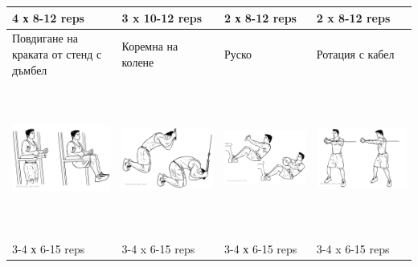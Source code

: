 \documentclass{article}
\begin{document}
\begin{tabular}{ | m{4cm} | m{4cm} | m{4cm} |  m{4cm} | }
4 х 8-12 reps & 3 x 10-12 reps & 2 х 8-12 reps & 2 x 8-12 reps \\ 
\hline
Повдигане на краката от стенд с дъмбел&  Коремна на колене & Руско & Ротация с кабел \\ 
\begin{minipage}{4cm} \includegraphics[width=\linewidth, height=50mm]{Knee_Hip_Raise.png} \end{minipage} & 
\begin{minipage}{4cm} \includegraphics[width=\linewidth, height=50mm]{Kneeling_Cable_Crunch.png} \end{minipage} &
\begin{minipage}{4cm} \includegraphics[width=\linewidth, height=50mm]{Russian_Twist.png} \end{minipage} & 
\begin{minipage}{4cm} \includegraphics[width=\linewidth, height=50mm]{Cable_Core_Rotation.png} \end{minipage} \\
3-4 х 6-15 reps & 3-4 x 6-15 reps & 3-4 х 6-15 reps & 3-4 x 6-15 reps \\ 
\hline
\end{tabular}
\end{document}
